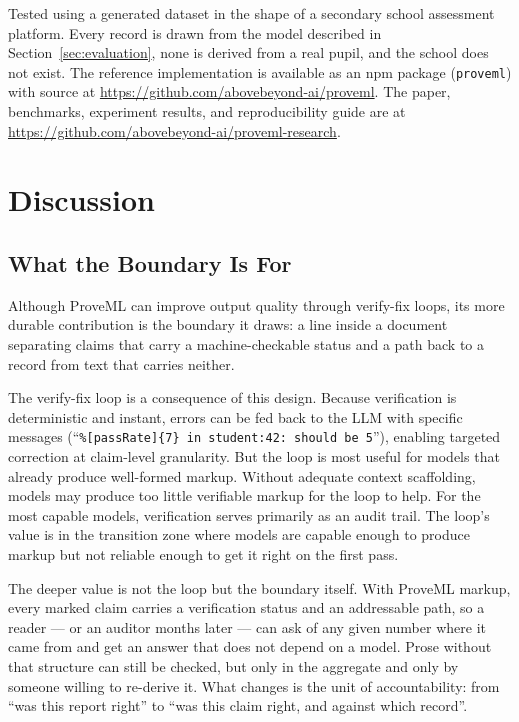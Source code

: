 \documentclass[11pt,a4paper]{article}
\begin{document}
\noindent Tested using a generated dataset in the shape of a secondary school assessment platform. Every record is drawn from the model described in Section~\ref{sec:evaluation}, none is derived from a real pupil, and the school does not exist. The reference implementation is available as an npm package (\texttt{proveml}) with source at \url{https://github.com/abovebeyond-ai/proveml}. The paper, benchmarks, experiment results, and reproducibility guide are at \url{https://github.com/abovebeyond-ai/proveml-research}.

\section{Discussion}

\subsection{What the Boundary Is For}

Although ProveML can improve output quality through verify-fix loops, its more durable contribution is the boundary it draws: a line inside a document separating claims that carry a machine-checkable status and a path back to a record from text that carries neither.

The verify-fix loop is a consequence of this design. Because verification is deterministic and instant, errors can be fed back to the LLM with specific messages (``\texttt{\%[passRate]\{7\} in student:42: should be 5}''), enabling targeted correction at claim-level granularity. But the loop is most useful for models that already produce well-formed markup. Without adequate context scaffolding, models may produce too little verifiable markup for the loop to help. For the most capable models, verification serves primarily as an audit trail. The loop's value is in the transition zone where models are capable enough to produce markup but not reliable enough to get it right on the first pass.

The deeper value is not the loop but the boundary itself. With ProveML markup, every marked claim carries a verification status and an addressable path, so a reader --- or an auditor months later --- can ask of any given number where it came from and get an answer that does not depend on a model. Prose without that structure can still be checked, but only in the aggregate and only by someone willing to re-derive it. What changes is the unit of accountability: from ``was this report right'' to ``was this claim right, and against which record''.
\end{document}
